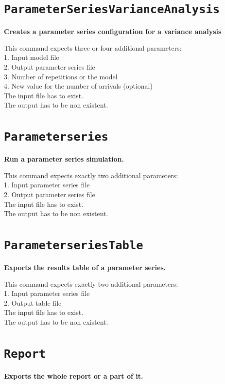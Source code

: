 \section{\texttt{ParameterSeriesVarianceAnalysis}}

\textbf{Creates a parameter series configuration for a variance analysis}

This command expects three or four additional parameters:\\
1. Input model file\\
2. Output parameter series file\\
3. Number of repetitions or the model\\
4. New value for the number of arrivals (optional)\\
The input file has to exist.\\
The output has to be non existent.

\section{\texttt{Parameterseries}}

\textbf{Run a parameter series simulation.}

This command expects exactly two additional parameters:\\
1. Input parameter series file\\
2. Output parameter series file\\
The input file has to exist.\\
The output has to be non existent.

\section{\texttt{ParameterseriesTable}}

\textbf{Exports the results table of a parameter series.}

This command expects exactly two additional parameters:\\
1. Input parameter series file\\
2. Output table file\\
The input file has to exist.\\
The output has to be non existent.

\section{\texttt{Report}}

\textbf{Exports the whole report or a part of it.}

